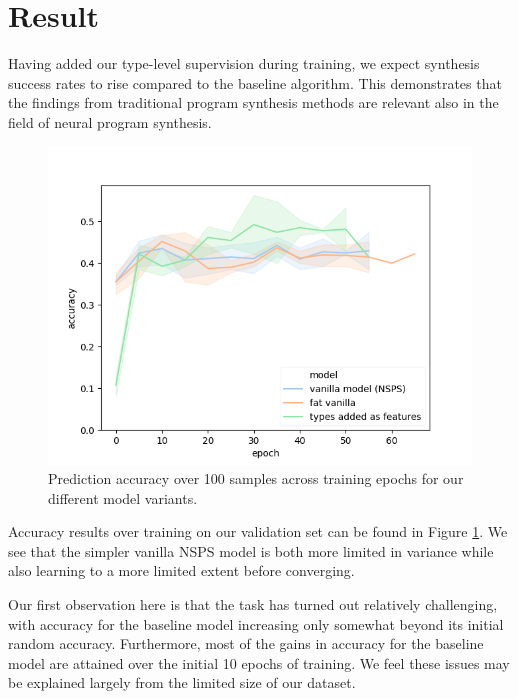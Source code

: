 \documentclass{article}
\begin{document}

\section{Result} \label{sec:result}

Having added our type-level supervision during training, we expect synthesis success rates to rise
compared to the baseline algorithm.
This demonstrates that the findings from traditional program synthesis methods are relevant also in the field of neural program synthesis.

\begin{figure}[h]
    \includegraphics[scale=0.7]{figures/experiments.png}
    \caption{Prediction accuracy over 100 samples across training epochs for our different model variants.}
    \label{fig:accuracy}
\end{figure}

Accuracy results over training on our validation set can be found in Figure \ref{fig:accuracy}.
We see that the simpler vanilla NSPS model is both more limited in variance while also learning to a more limited extent before converging.

Our first observation here is that the task has turned out relatively challenging,
with accuracy for the baseline model increasing only somewhat beyond its initial random accuracy.
Furthermore, most of the gains in accuracy for the baseline model are attained over the initial 10 epochs of training.
We feel these issues may be explained largely from the limited size of our dataset.
\end{document}
